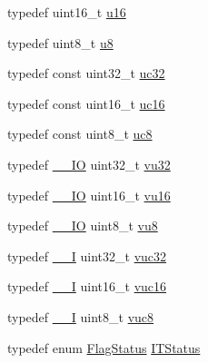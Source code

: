 \begin{DoxyCompactItemize}
\item 
typedef uint16\+\_\+t \hyperlink{group___exported__types_gace9d960e74685e2cd84b36132dbbf8aa}{u16}
\item 
typedef uint8\+\_\+t \hyperlink{group___exported__types_ga92c50087ca0e64fa93fc59402c55f8ca}{u8}
\item 
typedef const uint32\+\_\+t \hyperlink{group___exported__types_ga5b628e6a05856ff67e535fa391a57683}{uc32}
\item 
typedef const uint16\+\_\+t \hyperlink{group___exported__types_gabc715ea3779494b5a4f53173a397f7cb}{uc16}
\item 
typedef const uint8\+\_\+t \hyperlink{group___exported__types_gac74022c74a461f810e0d4fdc9bfea480}{uc8}
\item 
typedef \hyperlink{core__sc300_8h_aec43007d9998a0a0e01faede4133d6be}{\+\_\+\+\_\+\+IO} uint32\+\_\+t \hyperlink{group___exported__types_ga0cd21c4793673b69ecd5fd673353a145}{vu32}
\item 
typedef \hyperlink{core__sc300_8h_aec43007d9998a0a0e01faede4133d6be}{\+\_\+\+\_\+\+IO} uint16\+\_\+t \hyperlink{group___exported__types_ga93d1a6b3dcfdded10a7b15548679fe0a}{vu16}
\item 
typedef \hyperlink{core__sc300_8h_aec43007d9998a0a0e01faede4133d6be}{\+\_\+\+\_\+\+IO} uint8\+\_\+t \hyperlink{group___exported__types_ga4a8fa9a2b4796540a6d65a04eb18e111}{vu8}
\item 
typedef \hyperlink{core__sc300_8h_af63697ed9952cc71e1225efe205f6cd3}{\+\_\+\+\_\+I} uint32\+\_\+t \hyperlink{group___exported__types_ga2e08e321a35a55e72c5b3a507e76371f}{vuc32}
\item 
typedef \hyperlink{core__sc300_8h_af63697ed9952cc71e1225efe205f6cd3}{\+\_\+\+\_\+I} uint16\+\_\+t \hyperlink{group___exported__types_ga7f6037565f0caa27727c8b871daf0d56}{vuc16}
\item 
typedef \hyperlink{core__sc300_8h_af63697ed9952cc71e1225efe205f6cd3}{\+\_\+\+\_\+I} uint8\+\_\+t \hyperlink{group___exported__types_gab0ec90ac9b2c5864755998c8d37c264a}{vuc8}
\item 
typedef enum \hyperlink{group___exported__types_ga89136caac2e14c55151f527ac02daaff}{Flag\+Status} \hyperlink{group___exported__types_gaacbd7ed539db0aacd973a0f6eca34074}{I\+T\+Status}
\end{DoxyCompactItemize}
